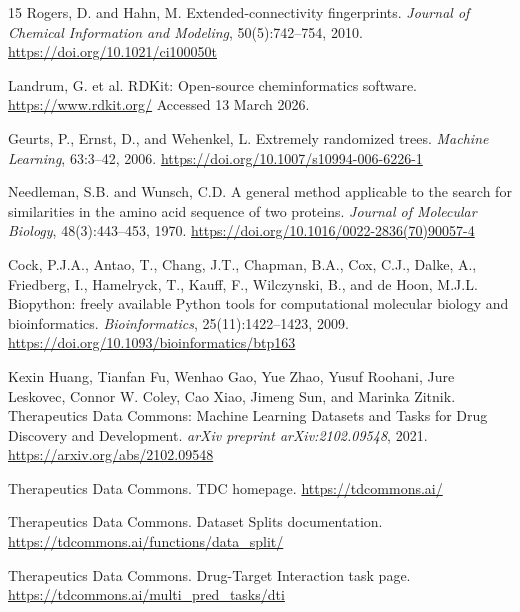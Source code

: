 \documentclass[11pt]{article}
\begin{document}
\begin{thebibliography}{15}
Rogers, D. and Hahn, M.
\newblock Extended-connectivity fingerprints.
\newblock \emph{Journal of Chemical Information and Modeling}, 50(5):742--754,
2010.
\newblock \url{https://doi.org/10.1021/ci100050t}

Landrum, G. et al.
\newblock RDKit: Open-source cheminformatics software.
\newblock \url{https://www.rdkit.org/}
\newblock Accessed 13 March 2026.

Geurts, P., Ernst, D., and Wehenkel, L.
\newblock Extremely randomized trees.
\newblock \emph{Machine Learning}, 63:3--42, 2006.
\newblock \url{https://doi.org/10.1007/s10994-006-6226-1}

Needleman, S.B. and Wunsch, C.D.
\newblock A general method applicable to the search for similarities in the
amino acid sequence of two proteins.
\newblock \emph{Journal of Molecular Biology}, 48(3):443--453, 1970.
\newblock \url{https://doi.org/10.1016/0022-2836(70)90057-4}

Cock, P.J.A., Antao, T., Chang, J.T., Chapman, B.A., Cox, C.J., Dalke, A.,
Friedberg, I., Hamelryck, T., Kauff, F., Wilczynski, B., and de Hoon, M.J.L.
\newblock Biopython: freely available Python tools for computational molecular
biology and bioinformatics.
\newblock \emph{Bioinformatics}, 25(11):1422--1423, 2009.
\newblock \url{https://doi.org/10.1093/bioinformatics/btp163}

Kexin Huang, Tianfan Fu, Wenhao Gao, Yue Zhao, Yusuf Roohani, Jure Leskovec,
Connor W. Coley, Cao Xiao, Jimeng Sun, and Marinka Zitnik.
\newblock Therapeutics Data Commons: Machine Learning Datasets and Tasks for
Drug Discovery and Development.
\newblock \emph{arXiv preprint arXiv:2102.09548}, 2021.
\newblock \url{https://arxiv.org/abs/2102.09548}

Therapeutics Data Commons.
\newblock TDC homepage.
\newblock \url{https://tdcommons.ai/}

Therapeutics Data Commons.
\newblock Dataset Splits documentation.
\newblock \url{https://tdcommons.ai/functions/data_split/}

Therapeutics Data Commons.
\newblock Drug-Target Interaction task page.
\newblock \url{https://tdcommons.ai/multi_pred_tasks/dti}

\end{thebibliography}
\end{document}
